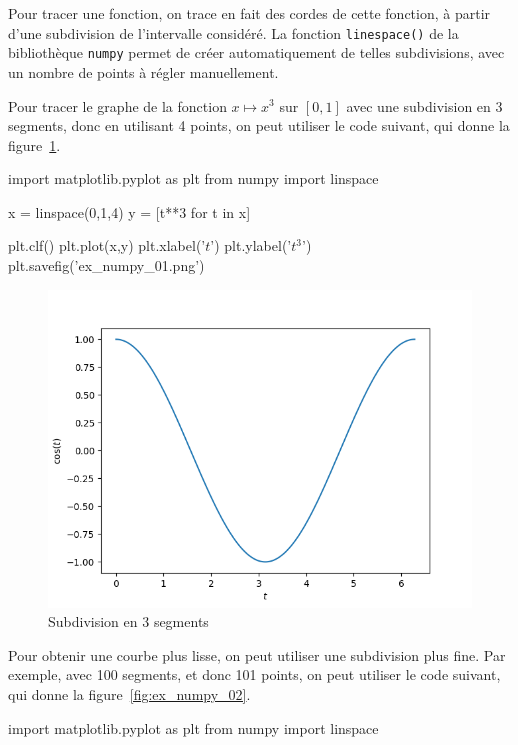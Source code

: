 Pour tracer une fonction, on trace en fait des cordes de cette fonction, à partir d'une subdivision de l'intervalle considéré. 
La fonction \texttt{linespace()} de la bibliothèque \texttt{numpy} permet de créer automatiquement de telles subdivisions, avec un nombre de points à régler manuellement. 

\begin{ex}
Pour tracer le graphe de la fonction $x\mapsto x^3$ sur $[0,1]$ avec une subdivision en 3 segments, donc en utilisant 
4 points, on peut utiliser le code suivant, qui donne la figure~\ref{fig:ex_numpy_01}.
\begin{pyverbatim}
import matplotlib.pyplot as plt
from numpy import linspace

x = linspace(0,1,4)
y = [t**3 for t in x]

plt.clf()
plt.plot(x,y)
plt.xlabel('$t$')
plt.ylabel('$t^3$')
plt.savefig('ex_numpy_01.png')
\end{pyverbatim}

\begin{figure}[!h]
  \begin{center}
    \includegraphics[scale = 0.5]{ex_numpy_01}
    \caption{Subdivision en 3 segments}
    \label{fig:ex_numpy_01}
  \end{center}
\end{figure}  
Pour obtenir une courbe plus lisse, on peut utiliser une subdivision plus fine. Par exemple, avec 100 segments, et donc 101 points, on peut utiliser le code suivant, qui donne la figure~\ref{fig:ex_numpy_02}.
\begin{pyverbatim}
import matplotlib.pyplot as plt
from numpy import linspace


\end{pyverbatim}
\end{ex}
